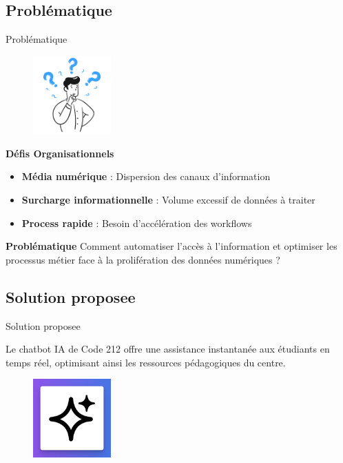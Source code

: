 \subsection{Problématique}
\begin{frame}{Problématique}
    \begin{figure}[H]
        \centering
        \includegraphics[height=3cm]{assets/images/question.png}
    \end{figure}
    
    \vspace{0.5cm}
    
    \begin{block}{\centering \textbf{Défis Organisationnels}}
        \begin{itemize}
            \setlength\itemsep{0.6em}
            \item \textbf{Média numérique} : Dispersion des canaux d'information
            \item \textbf{Surcharge informationnelle} : Volume excessif de données à traiter
            \item \textbf{Process rapide} : Besoin d'accélération des workflows
        \end{itemize}
    \end{block}
    
    \vspace{0.3cm}
    
    \begin{alertblock}{\centering \textbf{Problématique}}
        \centering
        Comment automatiser l'accès à l'information et optimiser les processus métier face à la prolifération des données numériques ?
    \end{alertblock}
\end{frame}

\subsection{Solution proposee}
\begin{frame}{Solution proposee}

    Le chatbot IA de Code 212 offre une assistance instantanée aux étudiants en temps réel, optimisant ainsi les ressources pédagogiques du centre.
    \begin{figure}[H]
        \centering
        \includegraphics[height=3cm]{assets/images/ia.png}
    \end{figure}
\end{frame}

